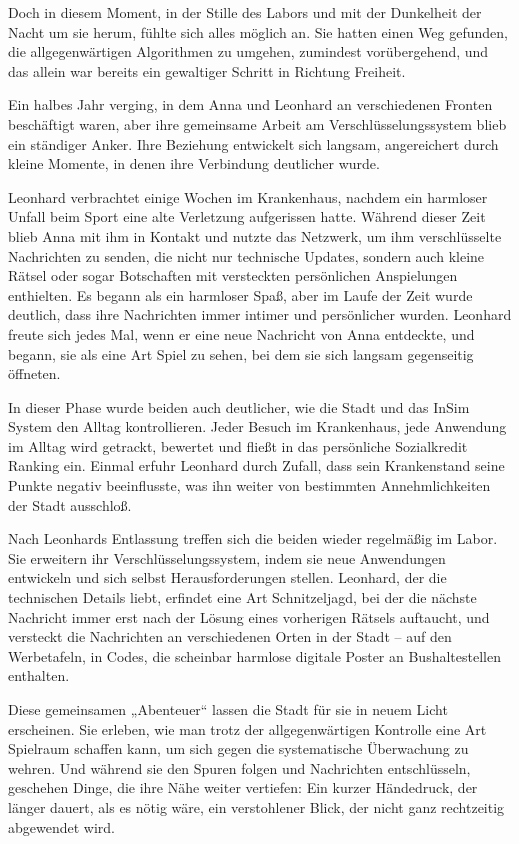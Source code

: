\documentclass[
]{article}
\begin{document}
Doch in diesem Moment, in der Stille des Labors und mit der Dunkelheit
der Nacht um sie herum, fühlte sich alles möglich an. Sie hatten einen
Weg gefunden, die allgegenwärtigen Algorithmen zu umgehen, zumindest
vorübergehend, und das allein war bereits ein gewaltiger Schritt in
Richtung Freiheit.

Ein halbes Jahr verging, in dem Anna und Leonhard an verschiedenen
Fronten beschäftigt waren, aber ihre gemeinsame Arbeit am
Verschlüsselungssystem blieb ein ständiger Anker. Ihre Beziehung
entwickelt sich langsam, angereichert durch kleine Momente, in denen
ihre Verbindung deutlicher wurde.

Leonhard verbrachtet einige Wochen im Krankenhaus, nachdem ein harmloser
Unfall beim Sport eine alte Verletzung aufgerissen hatte. Während dieser
Zeit blieb Anna mit ihm in Kontakt und nutzte das Netzwerk, um ihm
verschlüsselte Nachrichten zu senden, die nicht nur technische Updates,
sondern auch kleine Rätsel oder sogar Botschaften mit versteckten
persönlichen Anspielungen enthielten. Es begann als ein harmloser Spaß,
aber im Laufe der Zeit wurde deutlich, dass ihre Nachrichten immer
intimer und persönlicher wurden. Leonhard freute sich jedes Mal, wenn er
eine neue Nachricht von Anna entdeckte, und begann, sie als eine Art
Spiel zu sehen, bei dem sie sich langsam gegenseitig öffneten.

In dieser Phase wurde beiden auch deutlicher, wie die Stadt und das
InSim System den Alltag kontrollieren. Jeder Besuch im Krankenhaus, jede
Anwendung im Alltag wird getrackt, bewertet und fließt in das
persönliche Sozialkredit Ranking ein. Einmal erfuhr Leonhard durch
Zufall, dass sein Krankenstand seine Punkte negativ beeinflusste, was
ihn weiter von bestimmten Annehmlichkeiten der Stadt ausschloß.

Nach Leonhards Entlassung treffen sich die beiden wieder regelmäßig im
Labor. Sie erweitern ihr Verschlüsselungssystem, indem sie neue
Anwendungen entwickeln und sich selbst Herausforderungen stellen.
Leonhard, der die technischen Details liebt, erfindet eine Art
Schnitzeljagd, bei der die nächste Nachricht immer erst nach der Lösung
eines vorherigen Rätsels auftaucht, und versteckt die Nachrichten an
verschiedenen Orten in der Stadt -- auf den Werbetafeln, in Codes, die
scheinbar harmlose digitale Poster an Bushaltestellen enthalten.

Diese gemeinsamen „Abenteuer`` lassen die Stadt für sie in neuem Licht
erscheinen. Sie erleben, wie man trotz der allgegenwärtigen Kontrolle
eine Art Spielraum schaffen kann, um sich gegen die systematische
Überwachung zu wehren. Und während sie den Spuren folgen und Nachrichten
entschlüsseln, geschehen Dinge, die ihre Nähe weiter vertiefen: Ein
kurzer Händedruck, der länger dauert, als es nötig wäre, ein
verstohlener Blick, der nicht ganz rechtzeitig abgewendet wird.
\end{document}

